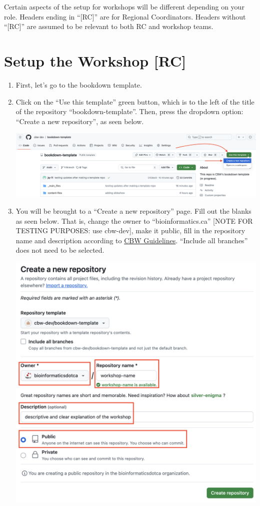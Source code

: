 \documentclass[
]{book}
\theoremstyle{definition}
\theoremstyle{definition}
\theoremstyle{definition}
\theoremstyle{definition}
\theoremstyle{remark}
\begin{document}
Certain aspects of the setup for workshops will be different depending on your role. Headers ending in ``{[}RC{]}'' are for Regional Coordinators. Headers without ``{[}RC{]}'' are assumed to be relevant to both RC and workshop teams.

\section{Setup the Workshop {[}RC{]}}\label{rc-workshop-setup}

\begin{enumerate}
\def\labelenumi{\arabic{enumi}.}
\item
  First, let's go to the bookdown template.
\item
  Click on the ``Use this template'' green button, which is to the left of the title of the repository ``bookdown-template''. Then, press the dropdown option: ``Create a new repository'', as seen below.

  \includegraphics{img/template/make-a-template.png}\\
\item
  You will be brought to a ``Create a new repository'' page. Fill out the blanks as seen below. That is, change the owner to ``bioinformatics.ca'' {[}NOTE FOR TESTING PURPOSES: use cbw-dev{]}, make it public, fill in the repository name and description according to \href{}{CBW Guidelines}. ``Include all branches'' does not need to be selected.

  \includegraphics{img/template/make-new-repo.png}\\


\end{enumerate}
\end{document}

